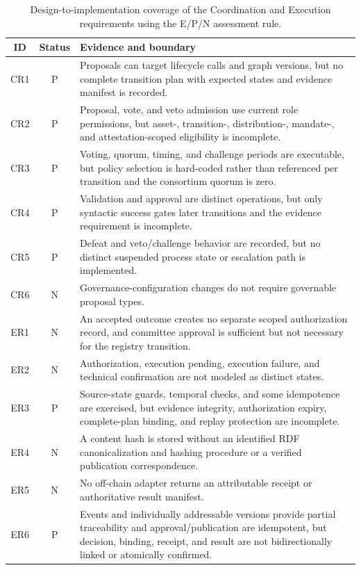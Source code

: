 \documentclass[journal]{IEEEtran}
\begin{document}
\begin{table}[t]
\centering
\caption{Design-to-implementation coverage of the Coordination and Execution requirements using the E/P/N assessment rule.}
\label{tab:crer_coverage}
\renewcommand{\arraystretch}{1.08}
\scriptsize
\begin{tabular}{@{}c c p{13.8cm}@{}}
\toprule
\textbf{ID} & \textbf{Status} & \textbf{Evidence and boundary} \\
\midrule
CR1 & P & Proposals can target lifecycle calls and graph versions, but no complete transition plan with expected states and evidence manifest is recorded. \\
CR2 & P & Proposal, vote, and veto admission use current role permissions, but asset-, transition-, distribution-, mandate-, and attestation-scoped eligibility is incomplete. \\
CR3 & P & Voting, quorum, timing, and challenge periods are executable, but policy selection is hard-coded rather than referenced per transition and the consortium quorum is zero. \\
CR4 & P & Validation and approval are distinct operations, but only syntactic success gates later transitions and the evidence requirement is incomplete. \\
CR5 & P & Defeat and veto/challenge behavior are recorded, but no distinct suspended process state or escalation path is implemented. \\
CR6 & N & Governance-configuration changes do not require governable proposal types. \\
ER1 & N & An accepted outcome creates no separate scoped authorization record, and committee approval is sufficient but not necessary for the registry transition. \\
ER2 & N & Authorization, execution pending, execution failure, and technical confirmation are not modeled as distinct states. \\
ER3 & P & Source-state guards, temporal checks, and some idempotence are exercised, but evidence integrity, authorization expiry, complete-plan binding, and replay protection are incomplete. \\
ER4 & N & A content hash is stored without an identified RDF canonicalization and hashing procedure or a verified publication correspondence. \\
ER5 & N & No off-chain adapter returns an attributable receipt or authoritative result manifest. \\
ER6 & P & Events and individually addressable versions provide partial traceability and approval/publication are idempotent, but decision, binding, receipt, and result are not bidirectionally linked or atomically confirmed. \\
\bottomrule
\end{tabular}
\end{table}
\end{document}
